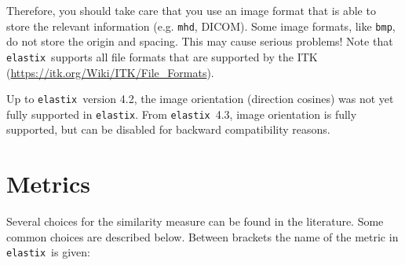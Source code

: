 \documentclass[]{report}
\newcommand{\elastix}{\texttt{elastix}}
\begin{document}
Therefore, you should take care that you use an image format that is
able to store the relevant information (e.g. \texttt{mhd}, DICOM).
Some image formats, like \texttt{bmp}, do not store the origin and
spacing. This may cause serious problems! Note that \elastix\
supports all file formats that are supported by the ITK
(\url{https://itk.org/Wiki/ITK/File_Formats}).

Up to \elastix\ version 4.2, the image orientation (direction cosines) was not
yet fully supported in \elastix. From \elastix\ 4.3, image orientation is fully
supported, but can be disabled for backward compatibility reasons.

\section{Metrics}\label{sec:comp:metric}

Several choices for the similarity measure can be found in the
literature. Some common choices are described below. Between brackets
the name of the metric in \elastix\ is given:
\end{document}
